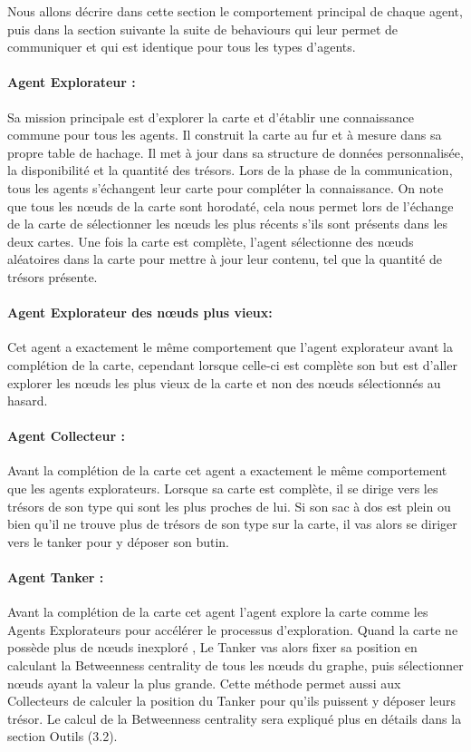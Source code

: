 \documentclass[10pt]{article}
\newcommand\tab[1][0.65cm]{\hspace*{#1}}
\begin{document}
	\tab Nous allons décrire dans cette section le comportement principal de chaque agent, puis dans la section suivante la suite de behaviours qui leur permet de communiquer et qui est identique pour tous les types d'agents.

\paragraph{Agent Explorateur :}
Sa mission principale est d'explorer la carte et d'établir une connaissance commune pour tous les agents. Il construit la carte au fur et à mesure dans sa propre table de hachage. Il met à jour dans sa structure de données personnalisée, la disponibilité et la quantité des trésors. Lors de la phase de la communication, tous les agents s'échangent leur carte pour compléter la connaissance. On note que tous les n\oe{}uds de la carte sont horodaté, cela nous permet lors de l'échange de la carte de sélectionner les n\oe{}uds les plus récents s'ils sont présents dans les deux cartes. Une fois la carte est complète, l'agent sélectionne des n\oe{}uds aléatoires dans la carte pour mettre à jour leur contenu, tel que la quantité de trésors présente.

\paragraph{Agent Explorateur des n\oe{}uds plus vieux:}
Cet agent a exactement le même comportement que l'agent explorateur avant la complétion de la carte, cependant lorsque celle-ci est complète son but est d'aller explorer les n\oe{}uds les plus vieux de la carte et non des n\oe{}uds sélectionnés au hasard.

\paragraph{Agent Collecteur :} Avant la complétion de la carte cet agent a exactement le même comportement que les agents explorateurs. Lorsque sa carte est complète, il se dirige vers les trésors de son type qui sont les plus proches de lui. Si son sac à dos est plein ou bien qu'il ne trouve plus de trésors de son type sur la carte, il vas alors se diriger vers le tanker pour y déposer son butin.

\paragraph{Agent Tanker :} Avant la complétion de la carte cet agent l'agent explore la carte comme les Agents Explorateurs pour accélérer le processus d'exploration. Quand la carte ne possède plus de n\oe{}uds inexploré , Le Tanker vas alors fixer sa position en calculant la Betweenness centrality de tous les n\oe{}uds du graphe, puis sélectionner n\oe{}uds ayant la valeur la plus grande. Cette méthode permet aussi aux Collecteurs de calculer la position du Tanker pour qu'ils puissent y déposer leurs trésor. Le calcul de la Betweenness centrality sera expliqué plus en détails dans la section Outils (3.2).
\end{document}
